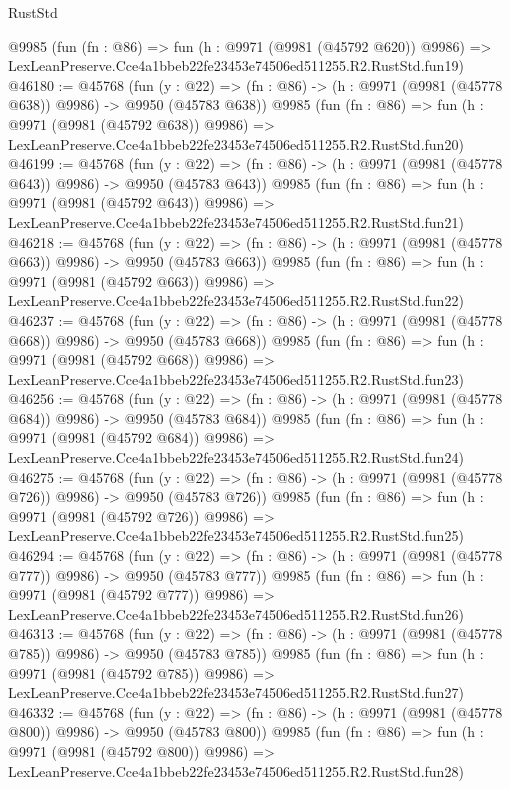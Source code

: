 \begin{lexlean}{RustStd}
\begin{coremodule}
    @9985
    (fun (fn : @86) =>
    fun (h : @9971 (@9981 (@45792 @620)) @9986) =>
    LexLeanPreserve.Cce4a1bbeb22fe23453e74506ed511255.R2.RustStd.fun19)
@46180 := @45768
    (fun (y : @22) => (fn : @86) -> (h : @9971 (@9981 (@45778 @638)) @9986) -> @9950 (@45783 @638))
    @9985
    (fun (fn : @86) =>
    fun (h : @9971 (@9981 (@45792 @638)) @9986) =>
    LexLeanPreserve.Cce4a1bbeb22fe23453e74506ed511255.R2.RustStd.fun20)
@46199 := @45768
    (fun (y : @22) => (fn : @86) -> (h : @9971 (@9981 (@45778 @643)) @9986) -> @9950 (@45783 @643))
    @9985
    (fun (fn : @86) =>
    fun (h : @9971 (@9981 (@45792 @643)) @9986) =>
    LexLeanPreserve.Cce4a1bbeb22fe23453e74506ed511255.R2.RustStd.fun21)
@46218 := @45768
    (fun (y : @22) => (fn : @86) -> (h : @9971 (@9981 (@45778 @663)) @9986) -> @9950 (@45783 @663))
    @9985
    (fun (fn : @86) =>
    fun (h : @9971 (@9981 (@45792 @663)) @9986) =>
    LexLeanPreserve.Cce4a1bbeb22fe23453e74506ed511255.R2.RustStd.fun22)
@46237 := @45768
    (fun (y : @22) => (fn : @86) -> (h : @9971 (@9981 (@45778 @668)) @9986) -> @9950 (@45783 @668))
    @9985
    (fun (fn : @86) =>
    fun (h : @9971 (@9981 (@45792 @668)) @9986) =>
    LexLeanPreserve.Cce4a1bbeb22fe23453e74506ed511255.R2.RustStd.fun23)
@46256 := @45768
    (fun (y : @22) => (fn : @86) -> (h : @9971 (@9981 (@45778 @684)) @9986) -> @9950 (@45783 @684))
    @9985
    (fun (fn : @86) =>
    fun (h : @9971 (@9981 (@45792 @684)) @9986) =>
    LexLeanPreserve.Cce4a1bbeb22fe23453e74506ed511255.R2.RustStd.fun24)
@46275 := @45768
    (fun (y : @22) => (fn : @86) -> (h : @9971 (@9981 (@45778 @726)) @9986) -> @9950 (@45783 @726))
    @9985
    (fun (fn : @86) =>
    fun (h : @9971 (@9981 (@45792 @726)) @9986) =>
    LexLeanPreserve.Cce4a1bbeb22fe23453e74506ed511255.R2.RustStd.fun25)
@46294 := @45768
    (fun (y : @22) => (fn : @86) -> (h : @9971 (@9981 (@45778 @777)) @9986) -> @9950 (@45783 @777))
    @9985
    (fun (fn : @86) =>
    fun (h : @9971 (@9981 (@45792 @777)) @9986) =>
    LexLeanPreserve.Cce4a1bbeb22fe23453e74506ed511255.R2.RustStd.fun26)
@46313 := @45768
    (fun (y : @22) => (fn : @86) -> (h : @9971 (@9981 (@45778 @785)) @9986) -> @9950 (@45783 @785))
    @9985
    (fun (fn : @86) =>
    fun (h : @9971 (@9981 (@45792 @785)) @9986) =>
    LexLeanPreserve.Cce4a1bbeb22fe23453e74506ed511255.R2.RustStd.fun27)
@46332 := @45768
    (fun (y : @22) => (fn : @86) -> (h : @9971 (@9981 (@45778 @800)) @9986) -> @9950 (@45783 @800))
    @9985
    (fun (fn : @86) =>
    fun (h : @9971 (@9981 (@45792 @800)) @9986) =>
    LexLeanPreserve.Cce4a1bbeb22fe23453e74506ed511255.R2.RustStd.fun28)

\end{coremodule}
\end{lexlean}
